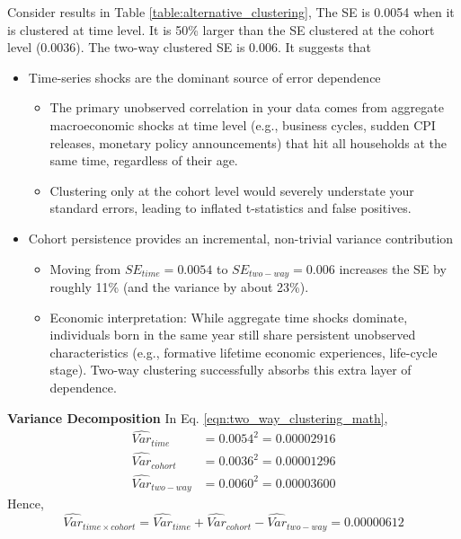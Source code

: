 \documentclass[10pt]{article}
\begin{document}
Consider results in Table \ref{table:alternative_clustering}, The SE is 0.0054 when it is clustered at time level.
It is 50\% larger than the SE clustered at the cohort level (0.0036). The two-way clustered SE is 0.006.
It suggests that
\begin{itemize}
\item 
		Time-series shocks are the dominant source of error dependence
		\begin{itemize}
    \item 
				The primary unobserved correlation in your data comes from aggregate macroeconomic shocks at time level
				(e.g., business cycles, sudden CPI releases, monetary policy announcements) that hit all households at the same time,
				regardless of their age.
    \item 
				Clustering only at the cohort level would severely understate your standard errors, leading to inflated t-statistics and
    		false positives.
		\end{itemize}

\item 
		Cohort persistence provides an incremental, non-trivial variance contribution
		\begin{itemize}
				\item 
						Moving from $ SE_{time} = 0.0054 $ to $ SE_{two-way} = 0.006 $ increases the SE by roughly 11\% (and the variance 
						by about 23\%).
				\item 
						Economic interpretation: While aggregate time shocks dominate, individuals born in the same year still share 
						persistent unobserved characteristics (e.g., formative lifetime economic experiences, life-cycle stage). 
						Two-way clustering successfully absorbs this extra layer of dependence.
		\end{itemize}	
\end{itemize}

{\textbf {Variance Decomposition}}
In Eq. \eqref{eqn:two_way_clustering_math},
\begin{align*}
\widehat{Var}_{time}    &= 0.0054^{2} = 0.00002916\\
\widehat{Var}_{cohort}  &= 0.0036^{2} = 0.00001296\\
\widehat{Var}_{two-way} &= 0.0060^{2} = 0.00003600
\end{align*}
Hence, 
\begin{equation*}
\widehat{Var}_{time  \times cohort} =  \widehat{Var}_{time} +  \widehat{Var}_{cohort} -  \widehat{Var}_{two-way} = 0.00000612
\end{equation*}
\end{document}
